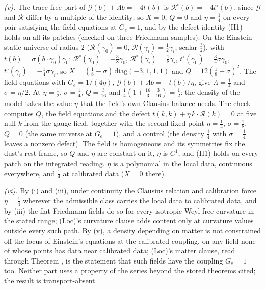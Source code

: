 \emph{(v).} The trace-free part of $\mathcal{G}(b) + \Lambda b = -4t(b)$ is $\mathcal{R}^{\circ}(b) = -4t^{\circ}(b)$, since $\mathcal{G}$ and $\mathcal{R}$ differ by a multiple of the identity; so $X = 0$, $Q = 0$ and $\eta = \tfrac14$ on every pair satisfying the field equations at $G_{e} = 1$, and by the defect identity (H1) holds on all its patches (checked on three Friedmann samples). On the Einstein static universe of radius $2$ ($\mathcal{R}(\gamma_{0}) = 0$, $\mathcal{R}(\gamma_{i}) = \tfrac12\gamma_{i}$, scalar $\tfrac32$), with $t(b) = \sigma(b\cdot\gamma_{0})\gamma_{0}$: $\mathcal{R}^{\circ}(\gamma_{0}) = -\tfrac38\gamma_{0}$, $\mathcal{R}^{\circ}(\gamma_{i}) = \tfrac18\gamma_{i}$, $t^{\circ}(\gamma_{0}) = \tfrac34\sigma\gamma_{0}$, $t^{\circ}(\gamma_{i}) = -\tfrac14\sigma\gamma_{i}$, so $X = (\tfrac18 - \sigma)\,\mathrm{diag}(-3, 1, 1, 1)$ and $Q = 12(\tfrac18 - \sigma)^{2}$. The field equations with $G_{e} = 1/(4\eta)$, $\mathcal{G}(b) + \Lambda b = -t(b)/\eta$, give $\Lambda = \tfrac14$ and $\sigma = \eta/2$. At $\eta = \tfrac12$, $\sigma = \tfrac14$, $Q = \tfrac{3}{16}$ and $\tfrac14(1 + \tfrac{16}{3}\cdot\tfrac{3}{16}) = \tfrac12$: the density of the model takes the value $\eta$ that the field's own Clausius balance needs. The check computes $Q$, the field equations and the defect $t(k,k) + \eta\,k\cdot\mathcal{R}(k) = 0$ at five null $k$ from the gauge field, together with the second fixed point $\eta = \tfrac14$, $\sigma = \tfrac18$, $Q = 0$ (the same universe at $G_{e} = 1$), and a control (the density $\tfrac14$ with $\sigma = \tfrac14$ leaves a nonzero defect). The field is homogeneous and its symmetries fix the dust's rest frame, so $Q$ and $\eta$ are constant on it, $\eta$ is $C^{1}$, and (H1) holds on every patch on the integrated reading. $\eta$ is a polynomial in the local data, continuous everywhere, and $\tfrac14$ at calibrated data ($X = 0$ there).

\emph{(vi).} By (i) and (iii), under continuity the Clausius relation and calibration force $\eta = \tfrac14$ wherever the admissible class carries the local data to calibrated data, and by (iii) the flat Friedmann fields do so for every isotropic Weyl-free curvature in the stated range; (Loc)'s curvature clause adds content only at curvature values outside every such path. By (v), a density depending on matter is not constrained off the locus of Einstein's equations at the calibrated coupling, on any field none of whose points has data near calibrated data; (Loc)'s matter clause, read through Theorem , is the statement that such fields have the coupling $G_{e} = 1$ too. Neither part uses a property of the series beyond the stored theorems cited; the result is transport-absent.
